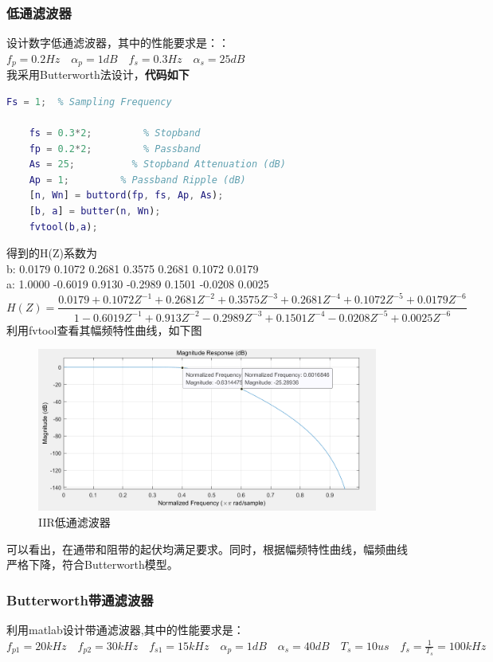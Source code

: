 \documentclass[UTF8]{ctexart}
\begin{document}
\subsubsection{低通滤波器}
设计数字低通滤波器，其中的性能要求是：：$f_p=0.2Hz \quad {\alpha}_p=1dB \quad f_s=0.3Hz \quad {\alpha}_s=25dB$\\
我采用Butterworth法设计，\textbf{代码如下}
\begin{lstlisting}[language=matlab]
	Fs = 1;  % Sampling Frequency
	
	fs = 0.3*2;         % Stopband 
	fp = 0.2*2;         % Passband 
	As = 25;          % Stopband Attenuation (dB)
	Ap = 1;         % Passband Ripple (dB)
	[n, Wn] = buttord(fp, fs, Ap, As);
	[b, a] = butter(n, Wn);
	fvtool(b,a);
\end{lstlisting}
得到的H(Z)系数为\\
\hspace*{2em}b:  0.0179    0.1072    0.2681    0.3575    0.2681    0.1072    0.0179 \\
\hspace*{2em}a:  1.0000   -0.6019    0.9130   -0.2989    0.1501   -0.0208    0.0025 \\
\[
H(Z)=\frac{0.0179+0.1072Z^{-1}+0.2681Z^{-2}+0.3575Z^{-3}+0.2681Z^{-4}+0.1072Z^{-5}+0.0179Z^{-6}}{1-0.6019Z^{-1}+0.913Z^{-2}-0.2989Z^{-3}+0.1501Z^{-4}-0.0208Z^{-5}+0.0025Z^{-6}}
\]
利用fvtool查看其幅频特性曲线，如下图
\begin{figure}[H]
	\centering
	\includegraphics[scale=0.8]{figs/iir2}
	\caption{IIR低通滤波器}
\end{figure}
可以看出，在通带和阻带的起伏均满足要求。同时，根据幅频特性曲线，幅频曲线严格下降，符合Butterworth模型。
\subsubsection{Butterworth带通滤波器}
利用matlab设计带通滤波器,其中的性能要求是：$f_{p1}=20kHz \quad f_{p2}=30kHz \quad f_{s1}=15kHz \quad {\alpha}_p=1dB \quad {\alpha}_s=40dB \quad T_s=10us \quad f_s=\frac{1}{T_s}=100kHz$
\end{document}
